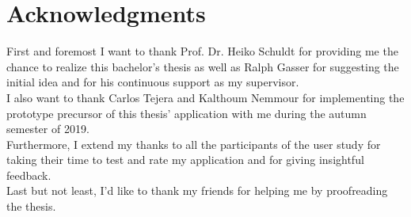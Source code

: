 \chapter{Acknowledgments}


First and foremost I want to thank Prof. Dr. Heiko Schuldt for providing me the chance to realize this bachelor's thesis as well as Ralph Gasser for suggesting the initial idea and for his continuous support as my supervisor.\\
I also want to thank Carlos Tejera and Kalthoum Nemmour for implementing the prototype precursor of this thesis' application with me during the autumn semester of 2019.\\
Furthermore, I extend my thanks to all the participants of the user study for taking their time to test and rate my application and for giving insightful feedback.\\
Last but not least, I'd like to thank my friends for helping me by proofreading the thesis.